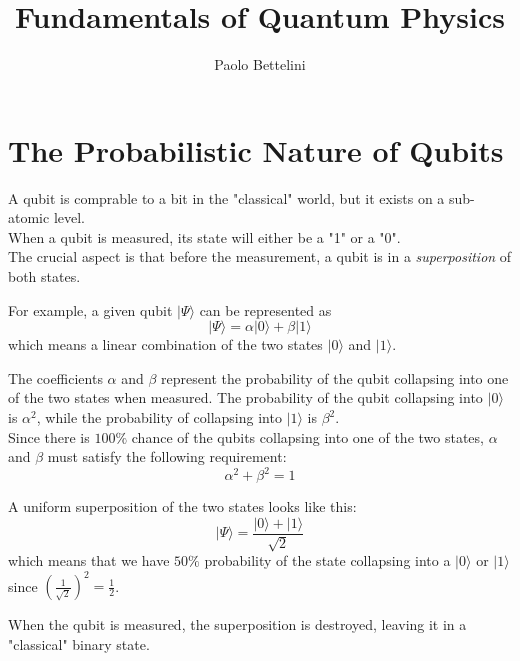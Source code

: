 \documentclass{article}
\title{Fundamentals of Quantum Physics }
\author{Paolo Bettelini}
\date{}
\begin{document}
\maketitle
\tableofcontents
\pagebreak

\section{The Probabilistic Nature of Qubits}

A qubit is comprable to a bit in the "classical" world, but it exists on a sub-atomic level. \\
When a qubit is measured, its state will either be a "1" or a "0". \\
The crucial aspect is that before the measurement, a qubit is in a \textit{superposition} of both states.

For example, a given qubit \(|\Psi\rangle\) can be represented as
\[
    |\Psi\rangle=\alpha |0\rangle+\beta |1\rangle
\]
which means a linear combination of the two states \(|0\rangle\) and \(|1\rangle\).

The coefficients \(\alpha\) and \(\beta\) represent the probability of the qubit collapsing into one of the two states when measured.
The probability of the qubit collapsing into \(|0\rangle\) is \(\alpha^2\),
while the probability of collapsing into \(|1\rangle\) is \(\beta^2\). \\
Since there is \(100\%\) chance of the qubits collapsing into one of the two states, \(\alpha\) and \(\beta\) must satisfy the following requirement:
\[
    \alpha^2+\beta^2=1
\]

A uniform superposition of the two states looks like this:
\[
    |\Psi\rangle=\frac{|0\rangle+|1\rangle}{\sqrt{2}}
\]
which means that we have \(50\%\) probability of the state collapsing into a \(|0\rangle\) or \(|1\rangle\)
since \(\left(\frac{1}{\sqrt{2}}\right)^2=\frac{1}{2}\).

When the qubit is measured, the superposition is destroyed, leaving it in a "classical" binary state.
\end{document}
